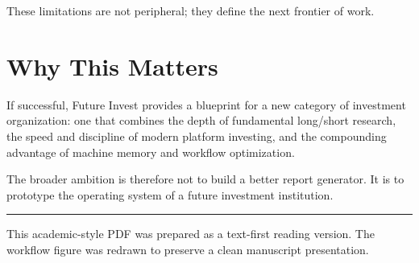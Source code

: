 \documentclass[11pt]{article}
\begin{document}
These limitations are not peripheral; they define the next frontier of work.

\section{Why This Matters}

If successful, Future Invest provides a blueprint for a new category of investment organization: one that combines the depth of fundamental long/short research, the speed and discipline of modern platform investing, and the compounding advantage of machine memory and workflow optimization.

The broader ambition is therefore not to build a better report generator. It is to prototype the operating system of a future investment institution.

\vspace{1em}
\hrule
\vspace{0.6em}

{\small\textcolor{fiSlate}{This academic-style PDF was prepared as a text-first reading version. The workflow figure was redrawn to preserve a clean manuscript presentation.}}
\end{document}
